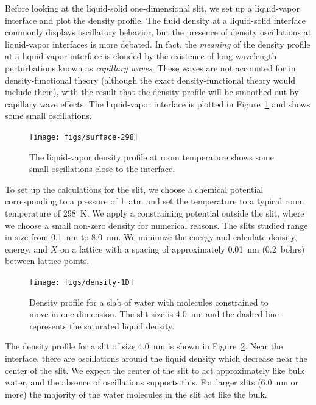 \documentclass[letterpaper,twocolumn,amsmath,amssymb,prb]{revtex4-1}
\begin{document}
Before looking at the liquid-solid one-dimensional slit, we set up a liquid-vapor
interface and plot the density profile.
The fluid density at a liquid-solid interface commonly displays
oscillatory behavior, but the presence of density oscillations at
liquid-vapor interfaces is more debated\cite{penfold2001structure}.
In fact, the \emph{meaning} of the density profile at a liquid-vapor
interface is clouded by the existence of long-wavelength perturbations
known as \emph{capillary waves}.  These waves are not accounted for in
density-functional theory (although the exact
density-functional theory would include them), with the result
that the density profile will be smoothed out by capillary wave effects. The liquid-vapor
interface is plotted in Figure~\ref{fig:liquid-vapor-profile} and shows
some small oscillations.


\begin{figure}
\begin{center}
\texttt{[image: figs/surface-298]}
\end{center}
\caption{The liquid-vapor density profile at room temperature shows
some small oscillations close to the interface.  }
\label{fig:liquid-vapor-profile}
\end{figure}

To set up the calculations for the slit, we choose a chemical potential 
corresponding to a pressure of 1~atm and set the
temperature to a typical room temperature of 298~K. We apply 
a constraining potential outside the slit, where we choose a small non-zero
density for numerical reasons. The slits studied range in size from 0.1~nm to 
8.0~nm. We minimize the energy and calculate density, energy, and $X$ on a
lattice
with a spacing of approximately 0.01~nm (0.2~bohrs) between lattice points.

\begin{figure}
\begin{center}
\texttt{[image: figs/density-1D]}
\end{center}
\caption{ Density profile for a slab of water with molecules 
constrained to move in one dimension. The slit size is 4.0~nm and the dashed
line represents the saturated liquid density.}
\label{fig:density-1D}
\end{figure}

The density profile for a slit of size 4.0~nm is shown in Figure~\ref{fig:density-1D}. 
Near the interface, there are oscillations around the
liquid density which decrease near the center of the slit. We expect the center
of the slit to act approximately like bulk water, and the absence of
oscillations supports this. For larger slits (6.0~nm or more) the majority of
the water molecules in the slit act like the bulk. 
\end{document}
